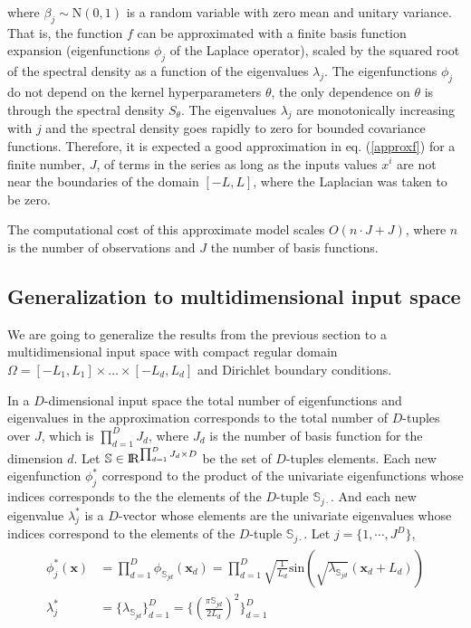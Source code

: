 \documentclass[]{interact}
\theoremstyle{plain}%
\theoremstyle{definition}
\theoremstyle{remark}
\begin{document}
\noindent where $\beta_j \sim \text{N}(0,1)$ is a random variable with zero mean and unitary variance. That is, the function $f$ can be approximated with a finite basis function expansion (eigenfunctions $\phi_j$ of the Laplace operator), scaled by the squared root of the spectral density as a function of the eigenvalues $\lambda_j$. The eigenfunctions $\phi_j$ do not depend on the kernel hyperparameters $\theta$, the only dependence on $\theta$ is through the spectral density $S_{\theta}$. The eigenvalues $\lambda_j$ are monotonically increasing with $j$ and the spectral density goes rapidly to zero for bounded covariance functions. Therefore, it is expected a good approximation in eq. (\ref{approxf}) for a finite number, $J$, of terms in the series as long as the inputs values $x^i$ are not near the boundaries of the domain $[-L,L]$, where the Laplacian was taken to be zero.

The computational cost of this approximate model scales $O(n\cdot J+J)$, where $n$ is the number of observations and $J$ the number of basis functions.



\subsection{Generalization to multidimensional input space}

We are going to generalize the results from the previous section to a multidimensional input space with compact regular domain $\Omega=[-L_1,L_1] \times \dots \times [-L_d,L_d]$ and Dirichlet boundary conditions.  

\vspace{0.2cm}
In a $D$-dimensional input space the total number of eigenfunctions and eigenvalues in the approximation corresponds to the total number of $D$-tuples over $J$, which is $\prod_{d=1}^{D} J_d$, where $J_d$ is the number of basis function for the dimension $d$. Let $\mathbb{S}\in {\rm I\!R}^{\prod_{d=1}^{D} J_d \times D}$ be the set of $D$-tuples elements. Each new eigenfunction $\phi^{\ast}_j$ correspond to the product of the univariate eigenfunctions whose indices corresponds to the the elements of the $D$-tuple $\mathbb{S}_{j\cdotp}$. And each new eigenvalue $\lambda^{\ast}_j$ is a $D$-vector whose elements are the univariate eigenvalues whose indices correspond to the elements of the $D$-tuple $\mathbb{S}_{j\cdotp}$. Let $j=\{1,\cdots,J^D\}$,
%
\begin{align} \label{bf&lambda_multi}
\begin{split}
\phi^{\ast}_j(\mathbf{x}) &= \prod_{d=1}^{D} \phi_{\mathbb{S}_{jd}}(\mathbf{x}_d) = \prod_{d=1}^{D} \sqrt{\frac{1}{L_d}} \text{sin}\left(\sqrt{\lambda_{\mathbb{S}_{jd}}}(\mathbf{x}_d+L_d)\right) \\
%
\lambda^{\ast}_j &= \{\lambda_{\mathbb{S}_{jd}} \}_{d=1}^D =  \{ \left(\tfrac{\pi \mathbb{S}_{jd}}{2L_d}\right)^2 \}_{d=1}^D  
\end{split}
\end{align}
\end{document}
